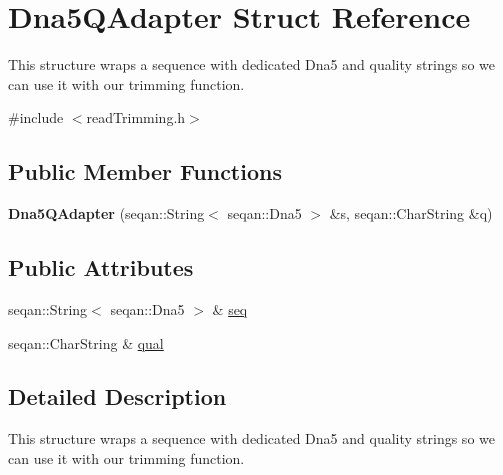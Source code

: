 \hypertarget{struct_dna5_q_adapter}{\section{Dna5\-Q\-Adapter Struct Reference}
\label{struct_dna5_q_adapter}
}


This structure wraps a sequence with dedicated Dna5 and quality strings so we can use it with our trimming function.  




{\ttfamily \#include $<$read\-Trimming.\-h$>$}

\subsection*{Public Member Functions}
\begin{DoxyCompactItemize}
\item 
\hypertarget{struct_dna5_q_adapter_a1e14155fda1f82ede4dddbd15f5cf084}{{\bfseries Dna5\-Q\-Adapter} (seqan\-::\-String$<$ seqan\-::\-Dna5 $>$ \&s, seqan\-::\-Char\-String \&q)}\label{struct_dna5_q_adapter_a1e14155fda1f82ede4dddbd15f5cf084}

\end{DoxyCompactItemize}
\subsection*{Public Attributes}
\begin{DoxyCompactItemize}
\item 
seqan\-::\-String$<$ seqan\-::\-Dna5 $>$ \& \hyperlink{struct_dna5_q_adapter_adbb31f790426215e45b4816c48e0e671}{seq}
\item 
seqan\-::\-Char\-String \& \hyperlink{struct_dna5_q_adapter_a760457b486ea989ec95958e78f7dff9f}{qual}
\end{DoxyCompactItemize}


\subsection{Detailed Description}
This structure wraps a sequence with dedicated Dna5 and quality strings so we can use it with our trimming function. 

